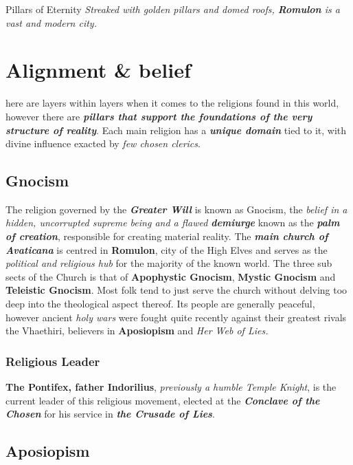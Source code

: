 \documentclass[letterpaper,twocolumn,openany,nodeprecatedcode,breakable,skins,xparse,most]{dndbook}
\begin{document}
\begingroup
\DndSetThemeColor[PhbMauve]
\begin{DndSidebar}{Pillars of Eternity}
\textit{Streaked with golden pillars and domed roofs, \textbf{Romulon} is a vast and modern city.}
\end{DndSidebar}
\endgroup

\section{Alignment \& belief}

here are layers within layers when it comes to the religions found in this world,
however there are \textit{\textbf{pillars that support the foundations of the very structure of reality}}. Each main religion has a \textbf{\textit{unique domain}} tied to it, with divine influence exacted by \textit{few chosen clerics}.

\subsection{Gnocism}

The religion governed by the \textit{\textbf{Greater Will}} is known as Gnocism, the \textit{belief in a hidden, uncorrupted supreme being and a flawed \textbf{demiurge}} known as the \textit{\textbf{palm of creation}}, responsible for creating material reality. The \textit{\textbf{main church of Avaticana}} is centred in \textbf{Romulon}, city of the High Elves and serves as the \textit{political and religious hub} for the majority of the known world. The three sub sects of the Church is that of\textbf{ Apophystic Gnocism}, \textbf{Mystic Gnocism }and \textbf{Teleistic Gnocism}. Most folk tend to just serve the church without delving too deep into the theological aspect thereof. Its people are generally peaceful, however ancient \textit{holy wars} were fought quite recently against their greatest rivals the Vhaethiri, believers in \textbf{Aposiopism} and \textit{Her Web of Lies.}

\subsubsection{Religious Leader}
\textbf{The Pontifex, father Indorilius}, \textit{previously a humble Temple Knight}, is the current leader of this religious movement, elected at the \textit{\textbf{Conclave of the Chosen }}for his service in \textit{\textbf{the Crusade of Lies}}.

\subsection{Aposiopism}
\end{document}
